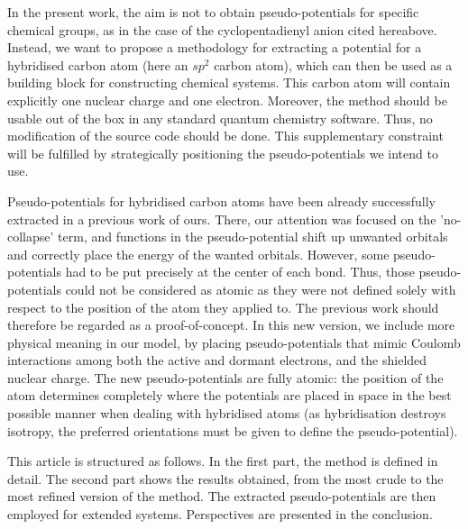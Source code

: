 \documentclass[12pt]{article}
\begin{document}

In the present work, the aim is not to obtain pseudo-potentials for  specific
chemical groups, as in the case of the cyclopentadienyl anion cited hereabove.
Instead, we want to propose a methodology for extracting a potential for
a hybridised carbon atom (here an $sp^2$ carbon atom), which can then be
used as a building block for constructing chemical systems. This carbon atom
will contain explicitly one nuclear charge and one electron.
Moreover, the method should be usable 
out of the box in any standard quantum chemistry software.
Thus, no modification of the source code should be done.
This supplementary constraint will be fulfilled by strategically positioning the pseudo-potentials
we intend to use. 

Pseudo-potentials for hybridised carbon
atoms have been already successfully extracted in a previous work of ours.\cite{drujon_pseudopotentials_2013}
There, our attention was focused on the 'no-collapse' term, and 
functions in the pseudo-potential shift up unwanted orbitals and correctly place the energy of the
wanted orbitals.
However, some pseudo-potentials had to be put precisely at the center
of each bond.
Thus, those pseudo-potentials could not be considered as atomic as they were not defined solely
with respect to the position of the atom they applied to. The previous work should therefore be regarded as a proof-of-concept.
In this new version, we include more physical meaning in our model, 
by placing pseudo-potentials that mimic Coulomb interactions among both the active and dormant electrons, and the shielded nuclear charge. 
The new pseudo-potentials are fully atomic: the position of the atom
determines completely where the potentials are placed in space in the best possible manner
when dealing with hybridised atoms (as hybridisation destroys isotropy, the preferred orientations
must be given to define the pseudo-potential).

This article is structured as follows.
In the first part, the method is defined in detail.
The second part shows the results obtained, from the most crude to the most refined
version of the method.
The extracted pseudo-potentials are then employed for extended systems.
Perspectives are presented in the conclusion.
\end{document}
